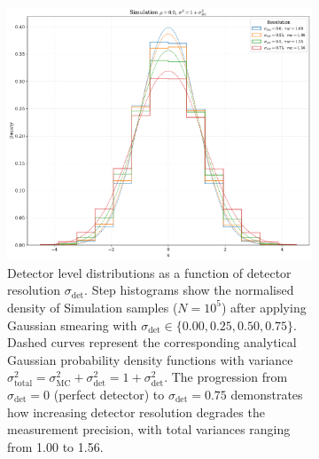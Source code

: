 \begin{figure}
  \centering
  \begin{subfigure}[t]{0.48\textwidth}
    \centering
    \includegraphics[width=\textwidth]{figures/chapter-07/unbinned_cor-smearing_examples.pdf}
    \caption{Detector level distributions as a function of detector resolution $\sigma_{\text{det}}$.
    Step histograms show the normalised density of Simulation samples ($N = 10^5$) after applying Gaussian smearing with $\sigma_{\text{det}} \in \{0.00, 0.25, 0.50, 0.75\}$. Dashed curves represent the corresponding analytical Gaussian probability density functions with variance $\sigma^2_{\text{total}} = \sigma^2_{\text{MC}} + \sigma^2_{\text{det}} = 1 + \sigma^2_{\text{det}}$.
    The progression from $\sigma_{\text{det}} = 0$ (perfect detector) to $\sigma_{\text{det}} = 0.75$ demonstrates how increasing detector resolution degrades the measurement precision, with total variances ranging from 1.00 to 1.56.}
    \label{fig:smearing-examples}
  \end{subfigure}
  \hfill
  \begin{subfigure}[t]{0.48\textwidth}
    \centering

\end{subfigure}
\end{figure}
